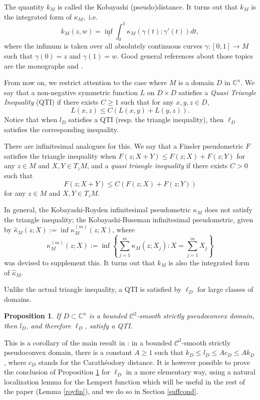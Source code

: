\documentclass[a4paper,12pt]{amsart}
\def\C{\mathbb C}
\newtheorem{prop}[thm]{Proposition}
\newtheorem{definition}[thm]{Definition}
\begin{document}
The quantity $k_M$ is called the Kobayashi (pseudo)distance.
It turns out that $k_M$ is the integrated form of $\kappa_M,$ i.e.
\begin{equation}
\label{kobadef}
k_M(z,w)=\inf_{\gamma}\int_0^1\kappa_M(\gamma(t);\gamma'(t))dt,
\end{equation}
where the infimum is taken over all absolutely continuous curves
$\gamma:[0,1]\to M$ such that $\gamma(0)=z$ and $\gamma(1)=w.$
Good general references about those topics are the monographs \cite{JP} and \cite{Ko}.

From now on, we restrict attention to the case where $M$ is a domain $D$ in $\C^n.$
We say that a non-negative symmetric function $L$ on $D\times D$ satisfies a \emph{Quasi Triangle Inequality}
(QTI) if there exists $C\ge 1$ such that for any $x, y , z \in D$,
\begin{equation}
\label{wti}
L (x,z) \le C \left( L (x,y) + L (y,z) \right).
\end{equation}
Notice that when $l_D$ satisfies a QTI (resp. the triangle inequality), then $\ell_D$
satisfies the corresponding inequality.

There are infinitesimal analogues for this.
We say that a Finsler pseudometric $F$
satisfies the triangle inequality when $F(z; X+Y) \le F(z;X)+F(z;Y)$
for any  $z\in M$ and $X,Y\in T_z M$,
and a \emph{quasi triangle inequality} if there exists
$C>0$ such that 
\[
F(z; X+Y) \le C(F(z;X)+F(z;Y))
\]
for any  $z\in M$ and $X,Y\in T_z M$.

In general, the Kobayashi-Royden infinitesimal pseudometric $\kappa_M$
does not satisfy the triangle inequality; the Kobayashi-Buseman
 infinitesimal pseudometric, given by
 $\hat \kappa_M (z;X):= \inf \kappa^{(m)}_M (z;X)$, where
\[
\kappa^{(m)}_M (z;X):= \inf\left\{ \sum_{j=1}^m \kappa_M (z;X_j): 
X= \sum_{j=1}^m X_j \right\}
\]
was devised to supplement this. It turns out that 
$k_M$ is also the integrated form of $\hat \kappa_M$.

\medskip
Unlike the actual triangle inequality, a QTI is satisfied by $\ell_D$ for large classes of domains.

\begin{prop}
\label{suff}
If $D \subset \C^n$ is a bounded $\mathcal C^2$-smooth strictly pseudoconvex domain, then $l_D$,
and therefore $\ell_D$, satisfy a QTI.
\end{prop}
This is a corollary of the main result in \cite{N}: in a bounded $\mathcal C^2$-smooth strictly pseudoconvex domain,
there is a constant $A \ge 1$ such that $k_D \le l_D \le A c_D \le A k_D$, where $c_D$ stands for the
Carath\'eodory distance. It is however possible to prove the conclusion of Proposition \ref{suff} for $\ell_D$ in a more elementary way, using
a natural localization lemma for the Lempert function which will be useful in the rest of the paper (Lemma \ref{royfin}),
and we do so in Section \ref{suffcond}.
\end{document}
